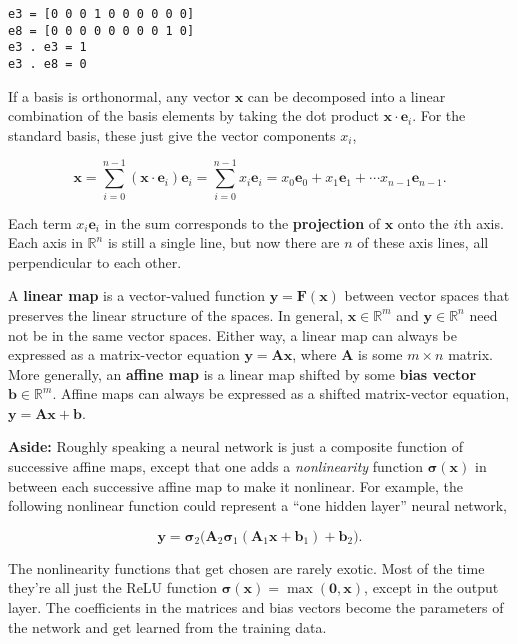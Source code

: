 \documentclass[
  letterpaper,
  DIV=11,
  numbers=noendperiod]{scrreprt}
\begin{document}
\begin{verbatim}
e3 = [0 0 0 1 0 0 0 0 0 0]
e8 = [0 0 0 0 0 0 0 0 1 0]
e3 . e3 = 1
e3 . e8 = 0
\end{verbatim}

If a basis is orthonormal, any vector \(\mathbf{x}\) can be decomposed
into a linear combination of the basis elements by taking the dot
product \(\mathbf{x} \cdot \mathbf{e}_i\). For the standard basis, these
just give the vector components \(x_i\),

\[\mathbf{x} = \sum_{i=0}^{n-1} (\mathbf{x} \cdot \mathbf{e}_i) \mathbf{e}_i = \sum_{i=0}^{n-1} x_i \mathbf{e}_i = x_0 \mathbf{e}_0 + x_1 \mathbf{e}_1 + \cdots x_{n-1} \mathbf{e}_{n-1}.\]

Each term \(x_i \mathbf{e}_i\) in the sum corresponds to the
\textbf{projection} of \(\mathbf{x}\) onto the \(i\)th axis. Each axis
in \(\mathbb{R}^n\) is still a single line, but now there are \(n\) of
these axis lines, all perpendicular to each other.

A \textbf{linear map} is a vector-valued function
\(\mathbf{y}=\mathbf{F}(\mathbf{x})\) between vector spaces that
preserves the linear structure of the spaces. In general,
\(\mathbf{x} \in \mathbb{R}^m\) and \(\mathbf{y} \in \mathbb{R}^n\) need
not be in the same vector spaces. Either way, a linear map can always be
expressed as a matrix-vector equation
\(\mathbf{y}=\mathbf{A}\mathbf{x}\), where \(\mathbf{A}\) is some
\(m \times n\) matrix. More generally, an \textbf{affine map} is a
linear map shifted by some \textbf{bias vector}
\(\mathbf{b} \in \mathbb{R}^m\). Affine maps can always be expressed as
a shifted matrix-vector equation,
\(\mathbf{y}=\mathbf{A}\mathbf{x} + \mathbf{b}\).

\textbf{Aside:} Roughly speaking a neural network is just a composite
function of successive affine maps, except that one adds a
\emph{nonlinearity} function \(\boldsymbol{\sigma}(\mathbf{x})\) in
between each successive affine map to make it nonlinear. For example,
the following nonlinear function could represent a ``one hidden layer''
neural network,

\[\mathbf{y} = \boldsymbol{\sigma}_2\big(\mathbf{A}_2\boldsymbol{\sigma}_1(\mathbf{A}_1\mathbf{x} + \mathbf{b}_1) + \mathbf{b}_2\big).\]

The nonlinearity functions that get chosen are rarely exotic. Most of
the time they're all just the ReLU function
\(\boldsymbol{\sigma}(\mathbf{x})=\max(\mathbf{0}, \mathbf{x})\), except
in the output layer. The coefficients in the matrices and bias vectors
become the parameters of the network and get learned from the training
data.
\end{document}
